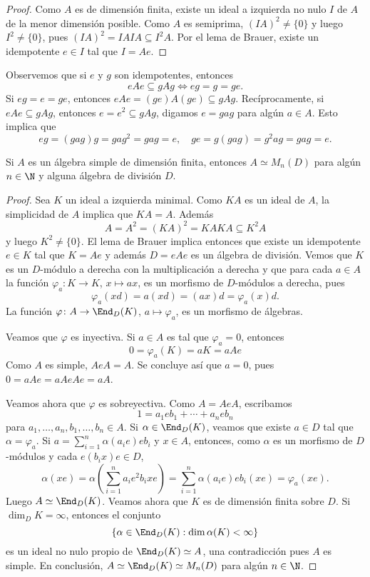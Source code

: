 \begin{proof}
Como $A$ es de dimensión finita, existe un ideal a izquierda 
no nulo $I$ de $A$ de la menor dimensión posible. 
Como $A$ es semiprima, $(IA)^2\ne\{0\}$ 
y luego $I^2\ne\{0\}$, pues  
$(IA)^2=IAIA\subseteq I^2A$. 	
Por el lema de Brauer, existe un idempotente $e\in I$ tal que $I=Ae$.
\end{proof}

Observemos que si $e$ y $g$ son idempotentes, entonces 
\[
eAe\subseteq gAg\Longleftrightarrow eg=g=ge.
\]
Si $eg=e=ge$, entonces $eAe=(ge)A(ge)\subseteq gAg$. Recíprocamente, si $eAe\subseteq gAg$, entonces
$e=e^2\subseteq gAg$, digamos $e=gag$ para algún $a\in A$. Esto implica que 
\[
eg=(gag)g=gag^2=gag=e,\quad
ge=g(gag)=g^2ag=gag=e.
\]  

\begin{theorem}[Wedderburn]
	Si $A$ es un álgebra simple 
	de dimensión finita, 
	entonces $A\simeq M_n(D)$ para algún $n\in\N$ y alguna álgebra de división $D$.  
\end{theorem}

\begin{proof}
	Sea $K$ un ideal a izquierda minimal. Como $KA$ es un ideal de $A$, la simplicidad de $A$ implica que
	$KA=A$. Además 
	\[
	A=A^2=(KA)^2=KAKA\subseteq K^2A
	\]
	y luego $K^2\ne\{0\}$. El lema de Brauer implica entonces que existe un idempotente $e\in K$ tal que
	$K=Ae$ y además $D=eAe$ es un álgebra de división. Vemos que $K$ es un $D$-módulo a derecha 
	con la multiplicación a derecha y que 
	para cada $a\in A$ 
	la función $\varphi_a\colon K\to K$, $x\mapsto ax$, es un morfismo de $D$-módulos a derecha, pues
	\[
	\varphi_a(xd)=a(xd)=(ax)d=\varphi_a(x)d.
	\]  
	La función $\varphi\colon A\to\End_D(K)$, $a\mapsto\varphi_a$, es un morfismo de álgebras. 
	
	Veamos que
	$\varphi$ es inyectiva. Si $a\in A$ es tal que $\varphi_a=0$, entonces 
	\[
	0=\varphi_a(K)=aK=aAe
	\]
	Como $A$ es simple, $AeA=A$. Se concluye así que $a=0$, pues 
	$0=aAe=aAeAe=aA$.   
	
	Veamos ahora que $\varphi$ es sobreyectiva. Como $A=AeA$, escribamos
	\[
	1=a_1eb_1+\cdots+a_neb_n
	\]
	para $a_1,\dots,a_n,b_1,\dots,b_n\in A$. 
	Si $\alpha\in\End_D(K)$, veamos que existe $a\in D$ tal que $\alpha=\varphi_a$. 
	Si $a=\sum_{i=1}^n\alpha(a_ie)eb_i$ y $x\in A$, entonces,
	como $\alpha$ es un morfismo de $D$-módulos y cada $e(b_ix)e\in D$, 
	\[
	\alpha(xe)=\alpha\left(\sum_{i=1}^na_ie^2b_ixe\right)=\sum_{i=1}^n\alpha(a_ie)eb_i(xe)=\varphi_a(xe).
	\] 
	Luego $A\simeq\End_D(K)$. Veamos ahora que $K$ es de dimensión finita sobre $D$. Si $\dim_D K=\infty$, entonces
	el conjunto
	\[
	\{\alpha\in\End_D(K):\dim\alpha(K)<\infty\}
	\]
	es un ideal no nulo propio de $\End_D(K)\simeq A$, 
	una contradicción pues $A$ es simple. En conclusión, 
	$A\simeq\End_D(K)\simeq M_n(D)$ para algún $n\in\N$.  
\end{proof}

